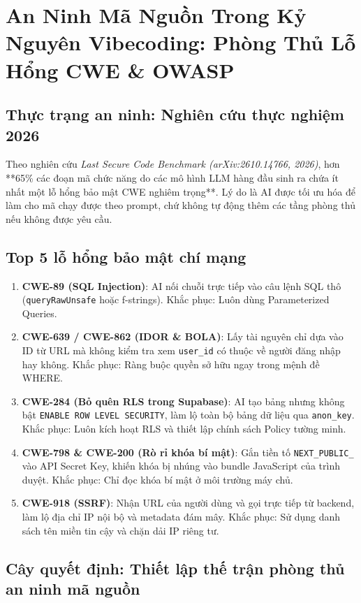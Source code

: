 \documentclass[a4paper,11pt]{report}
\begin{document}
\chapter{An Ninh Mã Nguồn Trong Kỷ Nguyên Vibecoding: Phòng Thủ Lỗ Hổng CWE \& OWASP}

\section{Thực trạng an ninh: Nghiên cứu thực nghiệm 2026}
Theo nghiên cứu \textit{Last Secure Code Benchmark (arXiv:2610.14766, 2026)}, hơn **65\% các đoạn mã chức năng do các mô hình LLM hàng đầu sinh ra chứa ít nhất một lỗ hổng bảo mật CWE nghiêm trọng**. Lý do là AI được tối ưu hóa để làm cho mã chạy được theo prompt, chứ không tự động thêm các tầng phòng thủ nếu không được yêu cầu.

\section{Top 5 lỗ hổng bảo mật chí mạng}
\begin{enumerate}[label={\arabic*.}]
    \item \textbf{CWE-89 (SQL Injection)}: AI nối chuỗi trực tiếp vào câu lệnh SQL thô (\texttt{queryRawUnsafe} hoặc f-strings). Khắc phục: Luôn dùng Parameterized Queries.
    \item \textbf{CWE-639 / CWE-862 (IDOR \& BOLA)}: Lấy tài nguyên chỉ dựa vào ID từ URL mà không kiểm tra xem \texttt{user\_id} có thuộc về người đăng nhập hay không. Khắc phục: Ràng buộc quyền sở hữu ngay trong mệnh đề WHERE.
    \item \textbf{CWE-284 (Bỏ quên RLS trong Supabase)}: AI tạo bảng nhưng không bật \texttt{ENABLE ROW LEVEL SECURITY}, làm lộ toàn bộ bảng dữ liệu qua \texttt{anon\_key}. Khắc phục: Luôn kích hoạt RLS và thiết lập chính sách Policy tường minh.
    \item \textbf{CWE-798 \& CWE-200 (Rò rỉ khóa bí mật)}: Gắn tiền tố \texttt{NEXT\_PUBLIC\_} vào API Secret Key, khiến khóa bị nhúng vào bundle JavaScript của trình duyệt. Khắc phục: Chỉ đọc khóa bí mật ở môi trường máy chủ.
    \item \textbf{CWE-918 (SSRF)}: Nhận URL của người dùng và gọi trực tiếp từ backend, làm lộ địa chỉ IP nội bộ và metadata đám mây. Khắc phục: Sử dụng danh sách tên miền tin cậy và chặn dải IP riêng tư.
\end{enumerate}

\section{Cây quyết định: Thiết lập thế trận phòng thủ an ninh mã nguồn}
\end{document}
